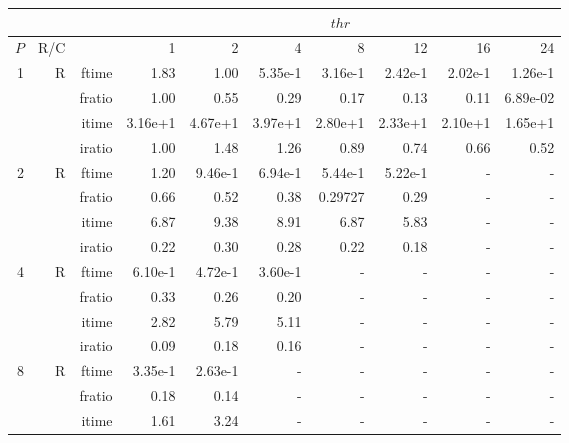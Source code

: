 \documentclass[a4paper]{article}
\begin{document}
\begin{table}[htbp]
\begin{center}
\begin{small}
\begin{tabular}{|r|r|r|r|r|r|r|r|r|r|}
\hline 
     & & & \multicolumn{7}{c|}{$thr$} \\ \hline
    $P$ & R/C &  & 1           & 2    & 4    & 8    & 12   & 16    & 24  \\ \hline\hline
   1 &  R &   ftime &    1.83  &    1.00 &    5.35e-1 &    3.16e-1 &    2.42e-1 &    2.02e-1 &    1.26e-1 \\
             &             &  fratio &    1.00 &    0.55 &    0.29 &    0.17 &    0.13 &    0.11 &    6.89e-02\\
             &             &  itime &    3.16e+1 &   4.67e+1 &   3.97e+1 &   2.80e+1 &   2.33e+1 &   2.10e+1 &   1.65e+1 \\
             &             &  iratio &    1.00 &    1.48  &    1.26  &   0.89 &    0.74 &    0.66 &    0.52 \\\hline
   2 &  R &   ftime &    1.20  &    9.46e-1 &    6.94e-1 &    5.44e-1 &    5.22e-1 &      - &      - \\
             &             &  fratio &    0.66 &   0.52 &    0.38 &    0.29727 &   0.29 &      - &      - \\
             &             &  itime &    6.87  &    9.38  &    8.91  &    6.87  &    5.83  &      - &      - \\
             &             &  iratio &   0.22 &    0.30 &    0.28 &   0.22 &    0.18 &      - &      - \\\hline
   4 &  R &   ftime &    6.10e-1 &    4.72e-1 &    3.60e-1 &      - &      - &      - &      - \\
             &             &  fratio &    0.33 &    0.26 &    0.20 &      - &      - &      - &      - \\
             &             &  itime &    2.82  &    5.79  &    5.11  &      - &      - &      - &      - \\
             &             &  iratio &    0.09 &   0.18 &    0.16 &      - &      - &      - &      - \\\hline
   8 &   R &   ftime &    3.35e-1 &    2.63e-1 &      - &      - &      - &      - &      - \\
             &             &  fratio &    0.18 &    0.14 &      - &      - &      - &      - &      - \\
             &             &  itime &    1.61  &    3.24  &      - &      - &      - &      - &      - \\

\end{tabular}
\end{small}
\end{center}
\end{table}
\end{document}
